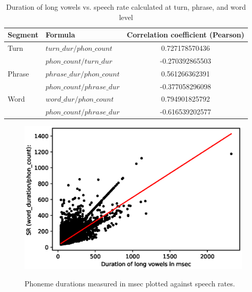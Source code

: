 \documentclass[a4paper]{scrreprt}
\begin{document}
\begin{table}[htbp]
\caption {Duration of long vowels vs. speech rate calculated at turn, phrase, and word level} 
\vspace{10mm}
\begin{tabular}{|l|l|c|}
\hline
Segment	 & Formula & Correlation coefficient (Pearson)\\
\hline
\hline
Turn 		& $turn\_dur / phon\_count$ &0.727178570436 \\
	\hline
	&  $phon\_count / turn\_dur$ & -0.270392865503 \\
	\hline
Phrase  & $phrase\_dur / phon\_count$ & 0.561266362391\\
	\hline
	&  $phon\_count / phrase\_dur$ & -0.377058296098\\
	\hline
Word  & $word\_dur / phon\_count$ &  0.794901825792\\
	\hline
	&  $phon\_count / phrase\_dur$ & -0.616539202577\\
	\hline
\end{tabular}
\end{table}

\begin{figure}[htbp]
	\centering
	\includegraphics[width=\textwidth]{../Graphen/SR4.eps}
	\label{fig:}
\caption[Speech rate vs long vowel duration]{Phoneme durations measured in msec plotted against speech rates.}
\label{fig:wsr}
\end{figure}
\end{document}
